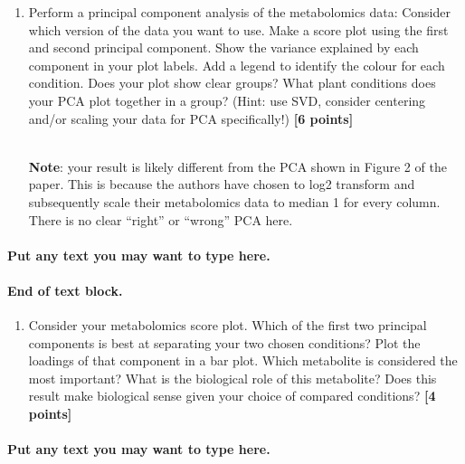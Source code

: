 \documentclass[
]{article}
\providecommand{\tightlist}{%
  \setlength{\itemsep}{0pt}\setlength{\parskip}{0pt}}
\begin{document}
\begin{enumerate}
\def\labelenumi{\Alph{enumi})}
\setcounter{enumi}{1}
\tightlist
\item
  Perform a principal component analysis of the metabolomics data:
  Consider which version of the data you want to use. Make a score plot
  using the first and second principal component. Show the variance
  explained by each component in your plot labels. Add a legend to
  identify the colour for each condition. Does your plot show clear
  groups? What plant conditions does your PCA plot together in a group?
  (Hint: use SVD, consider centering and/or scaling your data for PCA
  specifically!) \textbf{{[}6 points{]}}\\
  \strut \\
  \textbf{Note}: your result is likely different from the PCA shown in
  Figure 2 of the paper. This is because the authors have chosen to log2
  transform and subsequently scale their metabolomics data to median 1
  for every column. There is no clear ``right'' or ``wrong'' PCA here.
\end{enumerate}

\hypertarget{put-any-text-you-may-want-to-type-here.-14}{%
\paragraph{Put any text you may want to type
here.}\label{put-any-text-you-may-want-to-type-here.-14}}

\hypertarget{end-of-text-block.-16}{%
\paragraph{End of text block.}\label{end-of-text-block.-16}}

\begin{enumerate}
\def\labelenumi{\Alph{enumi})}
\setcounter{enumi}{2}
\tightlist
\item
  Consider your metabolomics score plot. Which of the first two
  principal components is best at separating your two chosen conditions?
  Plot the loadings of that component in a bar plot. Which metabolite is
  considered the most important? What is the biological role of this
  metabolite? Does this result make biological sense given your choice
  of compared conditions? \textbf{{[}4 points{]}}
\end{enumerate}

\hypertarget{put-any-text-you-may-want-to-type-here.-15}{%
\paragraph{Put any text you may want to type
here.}\label{put-any-text-you-may-want-to-type-here.-15}}
\end{document}
